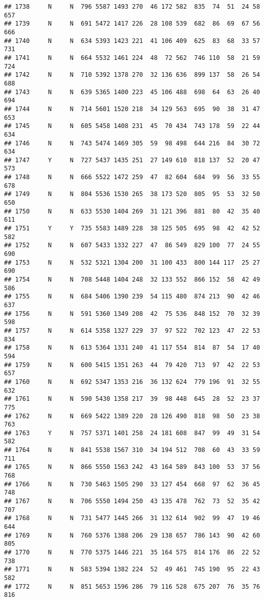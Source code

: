 \documentclass[]{article}
\begin{document}
\begin{verbatim}
## 1738     N     N  796 5587 1493 270  46 172 582  835  74  51  24 58  657
## 1739     N     N  691 5472 1417 226  28 108 539  682  86  69  67 56  666
## 1740     N     N  634 5393 1423 221  41 106 409  625  83  68  33 57  731
## 1741     N     N  664 5532 1461 224  48  72 562  746 110  58  21 59  724
## 1742     N     N  710 5392 1378 270  32 136 636  899 137  58  26 54  688
## 1743     N     N  639 5365 1400 223  45 106 488  698  64  63  26 40  694
## 1744     N     N  714 5601 1520 218  34 129 563  695  90  38  31 47  653
## 1745     N     N  605 5458 1408 231  45  70 434  743 178  59  22 44  634
## 1746     N     N  743 5474 1469 305  59  98 498  644 216  84  30 72  634
## 1747     Y     N  727 5437 1435 251  27 149 610  818 137  52  20 47  573
## 1748     N     N  666 5522 1472 259  47  82 604  684  99  56  33 55  678
## 1749     N     N  804 5536 1530 265  38 173 520  805  95  53  32 50  650
## 1750     N     N  633 5530 1404 269  31 121 396  881  80  42  35 40  611
## 1751     Y     Y  735 5583 1489 228  38 125 505  695  98  42  42 52  582
## 1752     N     N  607 5433 1332 227  47  86 549  829 100  77  24 55  690
## 1753     N     N  532 5321 1304 200  31 100 433  800 144 117  25 27  690
## 1754     N     N  708 5448 1404 248  32 133 552  866 152  58  42 49  586
## 1755     N     N  684 5406 1390 239  54 115 480  874 213  90  42 46  637
## 1756     N     N  591 5360 1349 208  42  75 536  848 152  70  32 39  598
## 1757     N     N  614 5358 1327 229  37  97 522  702 123  47  22 53  834
## 1758     N     N  613 5364 1331 240  41 117 554  814  87  54  17 40  594
## 1759     N     N  600 5415 1351 263  44  79 420  713  97  42  22 53  657
## 1760     N     N  692 5347 1353 216  36 132 624  779 196  91  32 55  632
## 1761     N     N  590 5430 1358 217  39  98 448  645  28  52  23 37  775
## 1762     N     N  669 5422 1389 220  28 126 490  818  98  50  23 38  763
## 1763     Y     N  757 5371 1401 258  24 181 608  847  99  49  31 54  582
## 1764     N     N  841 5538 1567 310  34 194 512  708  60  43  33 59  711
## 1765     N     N  866 5550 1563 242  43 164 589  843 100  53  37 56  768
## 1766     N     N  730 5463 1505 290  33 127 454  668  97  62  36 45  748
## 1767     N     N  706 5550 1494 250  43 135 478  762  73  52  35 42  707
## 1768     N     N  731 5477 1445 266  31 132 614  902  99  47  19 46  644
## 1769     N     N  760 5376 1388 206  29 138 657  786 143  90  42 60  805
## 1770     N     N  770 5375 1446 221  35 164 575  814 176  86  22 52  738
## 1771     N     N  583 5394 1382 224  52  49 461  745 190  95  22 43  582
## 1772     N     N  851 5653 1596 286  79 116 528  675 207  76  35 76  816

\end{verbatim}
\end{document}
